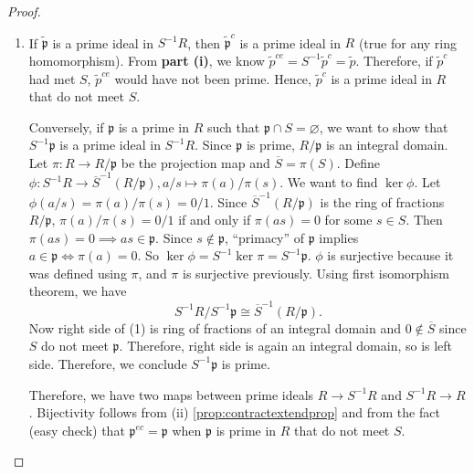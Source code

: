 \begin{proof}
\begin{enumerate}[label=\roman*)]
  Now we will prove the forward direction using contradiction. Suppose \( \mathfrak{a}^e = (1) \), but \( \mathfrak{a} \cap S = \varnothing \). 

  Since \( \mathfrak{a}^e = S^{-1}\mathfrak{a} = (1) \), there exists \( a / s \in \mathfrak{a}^e \) (\( a \in \mathfrak{a}, s \in S \)) such that \( a / s = 1 / 1 \). Then there exists  \( u \in S \) such that \( (a - s)u = au - su = 0 \), which implies  \( au = su \). \( au \in  \mathfrak{a} \), and \( su \in S \), therefore, \( au = su \in \mathfrak{a} \cap S \),  which is a contradiction. Thus, we have proven the forward direction.

\item If \( \widetilde{\mathfrak{p}} \) is a prime ideal in \( S^{-1}R \), then  \( \widetilde{\mathfrak{p}}^c \) is a prime ideal in \( R \) (true for any ring homomorphism). From \textbf{part (i)}, we know \( \widetilde{p}^{ce} = S^{-1}\widetilde{p}^c = \widetilde{p} \). Therefore, if  \( \widetilde{p}^c \) had met  \( S \), \( \widetilde{p}^{ce} \) would have not been prime. Hence, \( \widetilde{p}^c \) is a prime ideal in  \( R \) that do not meet  \( S \).

  Conversely, if  \( \mathfrak{p} \) is a prime in \( R \) such that \( \mathfrak{p} \cap S = \varnothing \), we want to show that \( S^{-1}\mathfrak{p} \) is a prime ideal in \( S^{-1}R \). Since \( \mathfrak{p} \) is prime, \( R / \mathfrak{p} \) is an integral domain. Let \( \pi : R \to R / \mathfrak{p} \) be the projection map and \( \overline{S} = \pi(S) \).  Define \( \phi : S^{-1} R \to \overline{S}^{-1}(R / \mathfrak{p}), a / s \mapsto \pi(a) / \pi(s) \). We want to find \( \ker \phi \). Let \( \phi(a / s) = \pi(a) / \pi(s) = 0 / 1 \). Since  \( \overline{S}^{-1}(R / \mathfrak{p}) \) is the ring of fractions \( R / \mathfrak{p} \), \( \pi(a) / \pi(s) = 0 / 1 \) if and only if \( \pi(as) = 0 \) for some \( s \in S \). Then \( \pi(as) = 0 \implies as \in \mathfrak{p} \). Since \( s \not\in \mathfrak{p} \), ``primacy'' of \( \mathfrak{p} \) implies \( a \in \mathfrak{p} \Longleftrightarrow \pi(a) = 0\). So \( \ker \phi = S^{-1}\ker \pi = S^{-1}\mathfrak{p} \). \( \phi \) is surjective because it was defined using  \( \pi \), and \( \pi \) is surjective previously. Using first isomorphism theorem, we have
  \[
    S^{-1}R / S^{-1} \mathfrak{p} \cong \overline{S}^{-1}(R / \mathfrak{p}).\tag{1}
  \]
  Now right side of (1) is ring of fractions of an integral domain and \( 0 \not\in \overline{S} \) since \( S \) do not meet  \( \mathfrak{p} \). Therefore, right side is again an integral domain, so is left side. Therefore, we conclude \( S^{-1}\mathfrak{p} \) is prime. 

  Therefore, we have two maps between prime ideals \( R \to S^{-1}R \) and  \( S^{-1}R \to R \). Bijectivity follows from (ii) \autoref{prop:contractextendprop} and from the fact (easy check) that \( \mathfrak{p}^{ec} = \mathfrak{p} \) when \( \mathfrak{p} \) is prime in \( R \) that do not meet \( S \).
 \end{enumerate} 
\end{proof}
